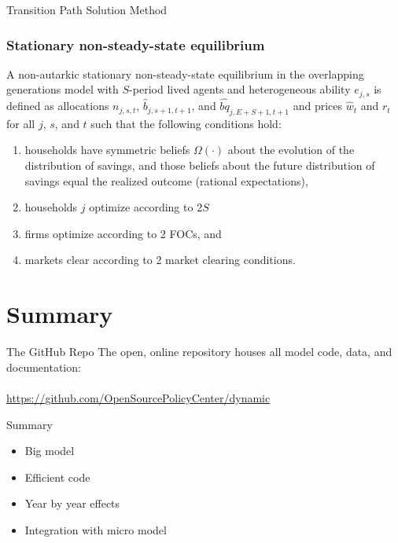 \documentclass{beamer}
\begin{document}
  \begin{frame}{Transition Path Solution Method}\label{TPI Solution}
    \frametitle{Stationary non-steady-state equilibrium}
      \begin{definition}
        A non-autarkic stationary non-steady-state equilibrium in the overlapping generations model with $S$-period lived agents and heterogeneous ability $e_{j,s}$ is defined as allocations $n_{j,s,t}$, $\hat{b}_{j,s+1,t+1}$, and $\hat{bq}_{j,E+S+1,t+1}$ and prices $\hat{w}_t$ and $r_t$ for all $j$, $s$, and $t$ such that the following conditions hold:
        \begin{enumerate}
          \item households have symmetric beliefs $\Omega(\cdot)$ about the evolution of the distribution of savings, and those beliefs about the future distribution of savings equal the realized outcome (rational expectations),
          \item households $j$ optimize according to $2S$
          \item firms optimize according to 2 FOCs, and
          \item markets clear according to 2 market clearing conditions.
        \end{enumerate}
      \end{definition}
  \end{frame}






\section{Summary}

  \begin{frame}{The GitHub Repo}
  The open, online repository houses all model code, data, and documentation: \\
  \ \\
\href{https://github.com/OpenSourcePolicyCenter/dynamic}{https://github.com/OpenSourcePolicyCenter/dynamic}
  \end{frame}

  \begin{frame}{Summary}
  \begin{itemize}
      \item Big model
      \item Efficient code
      \item Year by year effects
      \item Integration with micro model
  \end{itemize}
  \end{frame}
\end{document}
